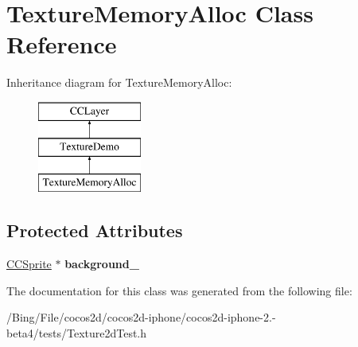 \hypertarget{interface_texture_memory_alloc}{\section{Texture\-Memory\-Alloc Class Reference}
\label{interface_texture_memory_alloc}
}
Inheritance diagram for Texture\-Memory\-Alloc\-:\begin{figure}[H]
\begin{center}
\leavevmode
\includegraphics[height=3.000000cm]{interface_texture_memory_alloc}
\end{center}
\end{figure}
\subsection*{Protected Attributes}
\begin{DoxyCompactItemize}
\item 
\hypertarget{interface_texture_memory_alloc_adc0b20b709183a03ba5e556314ddfe70}{\hyperlink{class_c_c_sprite}{C\-C\-Sprite} $\ast$ {\bfseries background\-\_\-}}\label{interface_texture_memory_alloc_adc0b20b709183a03ba5e556314ddfe70}

\end{DoxyCompactItemize}


The documentation for this class was generated from the following file\-:\begin{DoxyCompactItemize}
\item 
/\-Bing/\-File/cocos2d/cocos2d-\/iphone/cocos2d-\/iphone-\/2.-\/beta4/tests/Texture2d\-Test.\-h\end{DoxyCompactItemize}
